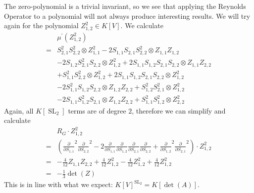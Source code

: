 \begin{example}
  The zero-polynomial is a trivial invariant, so we see that applying the Reynolds Operator to a polynomial will not always produce interesting results.
  We will try again for the polynomial $Z_{1,2}^2 \in K[V]$.
  We calculate
  \begin{equation}
    \begin{aligned}
      &\mu^\prime ( Z_{1,2}^2 ) \\
      =& S_{2,1}^2 S_{2,2}^2 \otimes Z_{1,1}^2
      - 2S_{1,1}S_{2,1}S_{2,2}^2 \otimes Z_{1,1}Z_{1,2} \\
      &- 2S_{1,2}S_{2,1}^2S_{2,2} \otimes Z_{1,2}^2 
      + 2S_{1,1}S_{1,2}S_{2,1}S_{2,2} \otimes Z_{1,1}Z_{2,2}\\
      &+ S_{1,1}^2S_{2,2}^2 \otimes Z_{1,2}^2
      + 2S_{1,1}S_{1,2}S_{2,1}S_{2,2} \otimes Z_{1,2}^2 \\
      &- 2S_{1,1}^2S_{1,2}S_{2,2} \otimes Z_{1,2}Z_{2,2}
      + S_{1,2}^2S_{2,1}^2 \otimes Z_{1,2}^2 \\
      &- 2S_{1,1}S_{1,2}^2S_{2,1} \otimes Z_{1,2}Z_{2,2}
      + S_{1,1}^2S_{1,2}^2 \otimes Z_{2,2}^2
    \end{aligned}
  \end{equation}
  Again, all $K[\operatorname{SL}_2]$ terms are of degree $2$, therefore we can simplify and calculate
  \begin{equation}
    \begin{aligned}
      &R_G \cdot Z_{1,2}^2\\
      =& \left( \frac{\partial}{\partial S_{1,1}}^2 \frac{\partial}{\partial S_{2,2}}^2 - 2 \frac{\partial}{\partial S_{1,1}} \frac{\partial}{\partial S_{1,2}} \frac{\partial}{\partial S_{2,1}} \frac{\partial}{\partial S_{2,2}} + \frac{\partial}{\partial S_{1,2}}^2\frac{\partial}{\partial S_{2,1}}^2 \right) \cdot Z_{1,2}^2 \\
      =& - \frac{4}{12} Z_{1,1}Z_{2,2} + \frac{4}{12} Z_{1,2}^2 - \frac{4}{12} Z_{1,2}^2 + \frac{4}{12} Z_{1,2}^2 \\
      =& -\frac{1}{3}\operatorname{det}(Z)
    \end{aligned}
  \end{equation}
  This is in line with what we expect: $K[V]^{\operatorname{SL}_2} = K[\operatorname{det}(A)]$.
\end{example}

